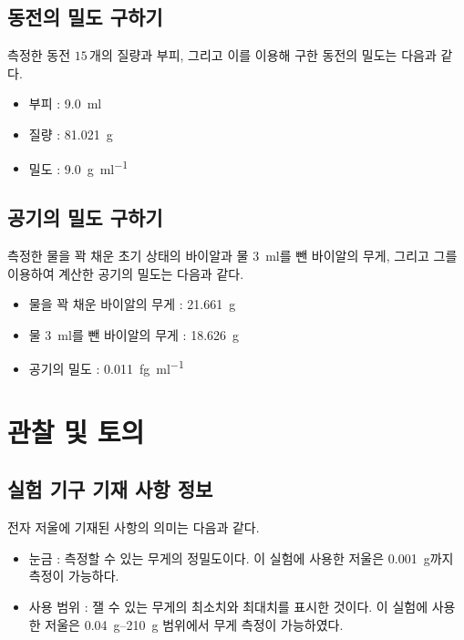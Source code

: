 \documentclass{GSHS-chemexp}
\begin{document}
	\subsection{동전의 밀도 구하기}
	측정한 동전 $15\,\mbox{개}$의 질량과 부피, 그리고 이를 이용해 구한
	동전의 밀도는 다음과 같다.
	\begin{itemize}
		\item 부피 : \SI{9.0}{\milli\litre}
		\item 질량 : \SI{81.021}{\gram}
		\item 밀도 : \SI{9.0}{\gram\per\milli\litre}
	\end{itemize}
	
	\subsection{공기의 밀도 구하기}
	측정한 물을 꽉 채운 초기 상태의 바이알과 물 \SI{3}{\milli\litre}를 뺀
	바이알의 무게, 그리고 그를 이용하여 계산한 공기의 밀도는 다음과 같다.
	\begin{itemize}
		\item 물을 꽉 채운 바이알의 무게 : \SI{21.661}{\gram}
		\item 물 \SI{3}{\milli\litre}를 뺀 바이알의 무게 :
		\SI{18.626}{\gram}
		\item 공기의 밀도 : \SI{0.011}{\femto\gram\per\milli\litre}
	\end{itemize}
	
	\section{관찰 및 토의}
	
	\subsection{실험 기구 기재 사항 정보}
	전자 저울에 기재된 사항의 의미는 다음과 같다.
	\begin{itemize}
		\item 눈금 : 측정할 수 있는 무게의 정밀도이다.
		이 실험에 사용한 저울은 \SI{0.001}{\gram}까지 측정이 가능하다.
		\item 사용 범위 : 잴 수 있는 무게의 최소치와 최대치를
		표시한 것이다.
		이 실험에 사용한 저울은 \SIrange{0.04}{210}{\gram} 범위에서
		무게 측정이 가능하였다.
	\end{itemize}
	
\end{document}
